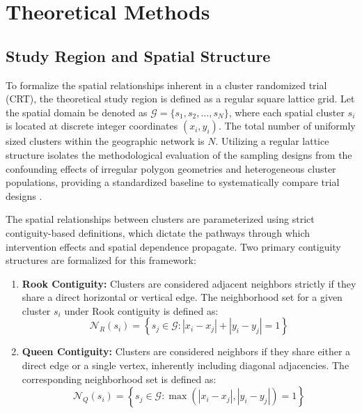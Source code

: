 \documentclass[11pt]{article}
\begin{document}
\setcounter{section}{1} %

\section{Theoretical Methods}

\subsection{Study Region and Spatial Structure}

To formalize the spatial relationships inherent in a cluster randomized trial (CRT), the theoretical study region is defined as a regular square lattice grid. Let the spatial domain be denoted as $\mathcal{G} = \{s_1, s_2, \dots, s_N\}$, where each spatial cluster $s_i$ is located at discrete integer coordinates $(x_i, y_i)$. The total number of uniformly sized clusters within the geographic network is $N$. Utilizing a regular lattice structure isolates the methodological evaluation of the sampling designs from the confounding effects of irregular polygon geometries and heterogeneous cluster populations, providing a standardized baseline to systematically compare trial designs \cite{cressie_statistics_1993}.

The spatial relationships between clusters are parameterized using strict contiguity-based definitions, which dictate the pathways through which intervention effects and spatial dependence propagate. Two primary contiguity structures are formalized for this framework:

\begin{enumerate}
    \item \textbf{Rook Contiguity:} Clusters are considered adjacent neighbors strictly if they share a direct horizontal or vertical edge. The neighborhood set for a given cluster $s_i$ under Rook contiguity is defined as:
    \begin{equation}
        \mathcal{N}_R(s_i) = \left\{ s_j \in \mathcal{G} : |x_i - x_j| + |y_i - y_j| = 1 \right\}
    \end{equation}
    
    \item \textbf{Queen Contiguity:} Clusters are considered neighbors if they share either a direct edge or a single vertex, inherently including diagonal adjacencies. The corresponding neighborhood set is defined as:
    \begin{equation}
        \mathcal{N}_Q(s_i) = \left\{ s_j \in \mathcal{G} : \max(|x_i - x_j|, |y_i - y_j|) = 1 \right\}
    \end{equation}
\end{enumerate}
\end{document}
